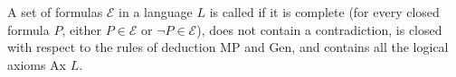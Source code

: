 A set of formulas $\mathcal{E}$ in a language $L$ is called  if it is complete (for every closed formula $P$, either $P \in \mathcal{E}$ or $\neg P \in \mathcal{E}$), does not contain a contradiction, is closed with respect to the rules of deduction MP and Gen, and contains all the logical axioms Ax $L$.
